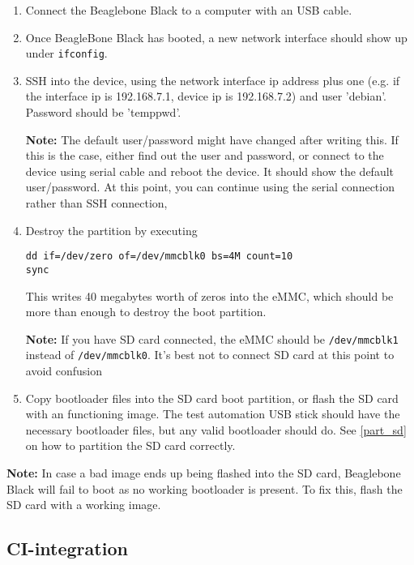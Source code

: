 \documentclass[a4paper,11pt]{article}
\newcommand{\note}{\textbf{Note: }}
\newcommand{\cmd}[1]{\texttt{#1}}
\begin{document}
\begin{enumerate}

\item Connect the Beaglebone Black to a computer with an USB cable. 

\item Once BeagleBone Black has booted, a new network interface should show up under \cmd{ifconfig}.

\item SSH into the device, using the network interface ip address plus one (e.g. if the interface ip is 192.168.7.1, device ip is 192.168.7.2) and user 'debian'. Password should be 'temppwd'.

\note The default user/password might have changed after writing this. If this is the case, either find out the user and password, or connect to the device using serial cable and reboot the device. It should show the default user/password. At this point, you can continue using the serial connection rather than SSH connection,

\item Destroy the partition by executing 

\begin{lstlisting}
dd if=/dev/zero of=/dev/mmcblk0 bs=4M count=10
sync
\end{lstlisting}

This writes 40 megabytes worth of zeros into the eMMC, which should be more than enough to destroy the boot partition.

\note If you have SD card connected, the eMMC should be \cmd{/dev/mmcblk1} instead of \cmd{/dev/mmcblk0}. It's best not to connect SD card at this point to avoid confusion

\item Copy bootloader files into the SD card boot partition, or flash the SD card with an functioning image. The test automation USB stick should have the necessary bootloader files, but any valid bootloader should do. See \ref{part_sd} on how to partition the SD card correctly.

\end{enumerate}

\note In case a bad image ends up being flashed into the SD card, Beaglebone Black will fail to boot as no working bootloader is present. To fix this, flash the SD card with a working image.


\subsection{CI-integration}
\end{document}
